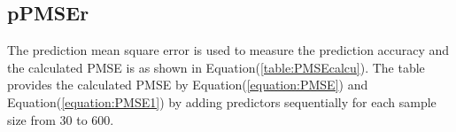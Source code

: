 \subsection{pPMSEr}

The prediction mean square error is used to measure the prediction accuracy and the calculated PMSE is as shown in Equation(\ref{table:PMSEcalcu}). The table provides the calculated PMSE by Equation(\ref{equation:PMSE}) and Equation(\ref{equation:PMSE1}) by adding predictors sequentially for each sample size from 30 to 600.

\begin{table}[h!]
    \centering{}
\end{table}
